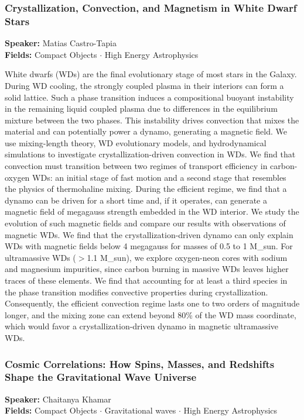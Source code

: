 \subsubsection*{Crystallization, Convection, and Magnetism in White Dwarf Stars}
\textbf{Speaker:} Matias Castro-Tapia\\
\textbf{Fields:} Compact Objects $\cdot$ High Energy Astrophysics

White dwarfs (WDs) are the final evolutionary stage of most stars in the Galaxy. During WD cooling, the strongly coupled plasma in their interiors can form a solid lattice. Such a phase transition induces a compositional buoyant instability in the remaining liquid coupled plasma due to differences in the equilibrium mixture between the two phases. This instability drives convection that mixes the material and can potentially power a dynamo, generating a magnetic field. We use mixing-length theory, WD evolutionary models, and hydrodynamical simulations to investigate crystallization-driven convection in WDs. We find that convection must transition between two regimes of transport efficiency in carbon-oxygen WDs: an initial stage of fast motion and a second stage that resembles the physics of thermohaline mixing. During the efficient regime, we find that a dynamo can be driven for a short time and, if it operates, can generate a magnetic field of megagauss strength embedded in the WD interior. We study the evolution of such magnetic fields and compare our results with observations of magnetic WDs. We find that the crystallization-driven dynamo can only explain WDs with magnetic fields below 4 megagauss for masses of 0.5 to 1 M\_sun. For ultramassive WDs ($>$1.1 M\_sun), we explore oxygen-neon cores with sodium and magnesium impurities, since carbon burning in massive WDs leaves higher traces of these elements. We find that accounting for at least a third species in the phase transition modifies convective properties during crystallization. Consequently, the efficient convection regime lasts one to two orders of magnitude longer, and the mixing zone can extend beyond 80\% of the WD mass coordinate, which would favor a crystallization-driven dynamo in magnetic ultramassive WDs.

\hypertarget{abstract-talk-307}{}\label{abstract-page-talk-307}
\subsubsection*{Cosmic Correlations: How Spins, Masses, and Redshifts Shape the Gravitational Wave Universe}
\textbf{Speaker:} Chaitanya Khamar\\
\textbf{Fields:} Compact Objects $\cdot$ Gravitational waves $\cdot$ High Energy Astrophysics

